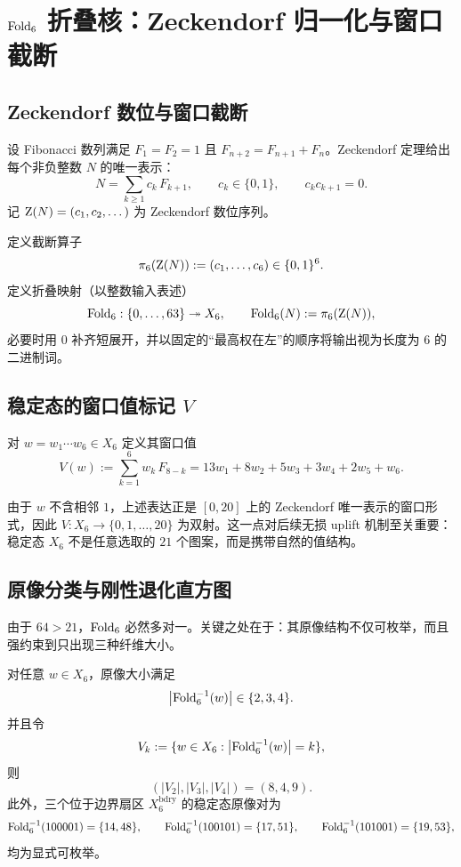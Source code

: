 
\section{$\mathrm{Fold}_6$ 折叠核：Zeckendorf 归一化与窗口截断}

\subsection{Zeckendorf 数位与窗口截断}

设 Fibonacci 数列满足 $F_1=F_2=1$ 且 $F_{n+2}=F_{n+1}+F_n$。Zeckendorf 定理给出每个非负整数 $N$ 的唯一表示\cite{zeckendorf1972representation}：
$$
N=\sum_{k\ge 1} c_k\,F_{k+1},\qquad c_k\in\{0,1\},\qquad c_kc_{k+1}=0.
$$
记 $\mathrm{Z}(N)=(c_1,c_2,\dots)$ 为 Zeckendorf 数位序列。

\begin{definition}[$m=6$ 的截断与折叠]
定义截断算子
$$
\pi_6(\mathrm{Z}(N)) := (c_1,\dots,c_6)\in\{0,1\}^6.
$$
定义折叠映射（以整数输入表述）
$$
\mathrm{Fold}_6:\{0,\dots,63\}\twoheadrightarrow X_6,\qquad
\mathrm{Fold}_6(N):=\pi_6(\mathrm{Z}(N)),
$$
必要时用 $0$ 补齐短展开，并以固定的“最高权在左”的顺序将输出视为长度为 $6$ 的二进制词。
\end{definition}

\subsection{稳定态的窗口值标记 $V$}

\begin{definition}
对 $w=w_1\cdots w_6\in X_6$ 定义其窗口值
$$
V(w):=\sum_{k=1}^{6} w_k\,F_{8-k}
=13w_1+8w_2+5w_3+3w_4+2w_5+w_6.
$$
\end{definition}

由于 $w$ 不含相邻 $1$，上述表达正是 $[0,20]$ 上的 Zeckendorf 唯一表示的窗口形式，因此 $V:X_6\to\{0,1,\dots,20\}$ 为双射。这一点对后续无损 uplift 机制至关重要：稳定态 $X_6$ 不是任意选取的 $21$ 个图案，而是携带自然的值结构。

\subsection{原像分类与刚性退化直方图}

由于 $64>21$，$\mathrm{Fold}_6$ 必然多对一。关键之处在于：其原像结构不仅可枚举，而且强约束到只出现三种纤维大小。

\begin{theorem}
对任意 $w\in X_6$，原像大小满足
$$
\bigl|\mathrm{Fold}_6^{-1}(w)\bigr|\in\{2,3,4\}.
$$
并且令
$$
V_k:=\{w\in X_6:\bigl|\mathrm{Fold}_6^{-1}(w)\bigr|=k\},
$$
则
$$
(|V_2|,|V_3|,|V_4|)=(8,4,9).
$$
此外，三个位于边界扇区 $X_6^{\mathrm{bdry}}$ 的稳定态原像对为
$$
\mathrm{Fold}_6^{-1}(100001)=\{14,48\},\qquad
\mathrm{Fold}_6^{-1}(100101)=\{17,51\},\qquad
\mathrm{Fold}_6^{-1}(101001)=\{19,53\},
$$
均为显式可枚举。
\end{theorem}

